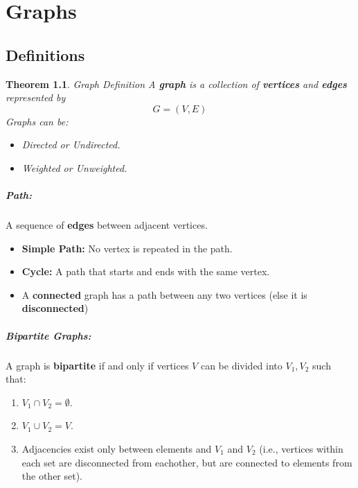 \documentclass[a4paper,12pt]{report}
\newtheorem{theorem}{Theorem}
\begin{document}
\chapter{Graphs}

\section{Definitions}

\begin{theorem}{Graph Definition}
A \textbf{graph} is a collection of \textbf{vertices} and \textbf{edges} represented by 
\begin{equation}
G = (V,E)
\end{equation}
Graphs can be:
\begin{itemize}
\item Directed or Undirected.
\item Weighted or Unweighted.
\end{itemize}

\end{theorem}


\paragraph{Path: } A sequence of \textbf{edges} between adjacent vertices. 
\begin{itemize}
\item \textbf{Simple Path: } No vertex is repeated in the path.
\item \textbf{Cycle: } A path that starts and ends with the same vertex.
\item A \textbf{connected} graph has a path between any two vertices (else it is \textbf{disconnected})
\end{itemize}


\paragraph{Bipartite Graphs: } A graph is \textbf{bipartite} if and only if vertices $V$ can be divided into $V_1, V_2$ such that:
\begin{enumerate}
\item $V_1 \cap V_2 = \emptyset$.
\item $V_1 \cup V_2 = V$.
\item Adjacencies exist only between elements and $V_1$ and $V_2$ (i.e., vertices within each set are disconnected from eachother, but are connected to elements from the other set).
\end{enumerate}
\end{document}
